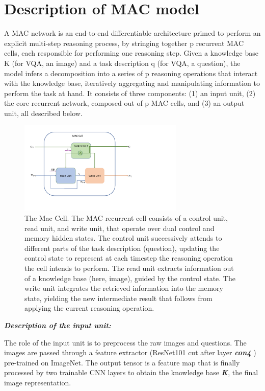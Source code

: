 \section{Description of MAC model}


A MAC network is an end-to-end differentiable architecture primed to perform an explicit multi-step reasoning process, by stringing together p recurrent MAC cells, each responsible for performing one reasoning step. Given a knowledge base K (for VQA, an image) and a task description q (for VQA, a question), the model infers a decomposition into a series of p reasoning operations that interact with the knowledge base, iteratively aggregating and manipulating information to perform the task at hand. It consists of three components: (1) an input unit, (2) the core recurrent network, composed out of p MAC cells, and (3) an output unit, all described below.

\begin{figure}[htbp]
	\centering
	\includegraphics[width=0.7\textwidth]{img/mac_cell.pdf}
	\caption{The Mac Cell. The MAC recurrent cell consists of a control unit, read unit, and write unit, that operate over dual control and memory hidden states. The control unit successively attends to different parts of the task description (question), updating the control state to represent at each timestep the reasoning operation the cell intends to perform. The read unit extracts information out of a knowledge base (here, image), guided by the control state. The write unit integrates the retrieved information into the memory state, yielding the new intermediate result that follows from applying the current reasoning operation.}
	\label{fig:core_concepts}
\end{figure}

\textbf{\textit{Description of the input unit:}}

The role of the input unit is to preprocess the raw images and questions. 
The images are passed through a feature extractor (ResNet101 cut after layer \textbf{\textit{con4}} ) pre-trained on ImageNet. The output tensor is a feature map that is finally processed by two trainable CNN layers to obtain the knowledge base \textbf{\textit{K}}, the final image representation.

